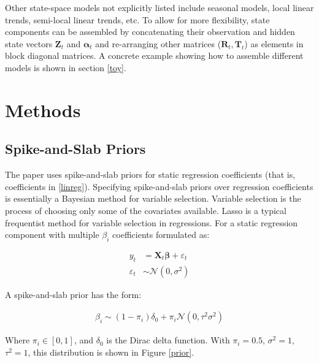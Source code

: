 \documentclass[12pt]{article}
\begin{document}
Other state-space models not explicitly  listed include seasonal models, local linear trends, semi-local linear trends, etc. To allow for more flexibility, state components can be assembled by concatenating their observation and hidden state vectors $\boldsymbol{Z}_t$ and $\boldsymbol{\alpha}_t$ and re-arranging other matrices ($\boldsymbol{R}_t, \boldsymbol{T}_t$) as elements in block diagonal matrices. A concrete example showing how to assemble different models is shown in section \ref{toy}.




\section{Methods}
\subsection{Spike-and-Slab Priors}
The paper uses spike-and-slab priors for static regression coefficients (that is, coefficients in \ref{linreg}). Specifying spike-and-slab priors over regression coefficients is essentially a Bayesian method for variable selection. Variable selection is the process of choosing only some of the covariates available. Lasso is a typical frequentist method for variable selection in regressions. For a static regression component with multiple $\beta_i$ coefficients formulated as:

\begin{align}
    y_t &=  \boldsymbol{X}_t\boldsymbol{\beta} + \varepsilon_t\\
     \varepsilon_t &\sim \mathcal{N}(0, \sigma^2)
\end{align}

A spike-and-slab prior has the form:

\begin{align} 
    \beta_i \sim (1-\pi_i)\delta_0 + \pi_i\mathcal{N}(0, \tau^2\sigma^2)
\end{align}


Where $\pi_i \in [0, 1]$, and $\delta_0$ is the Dirac delta function. With $\pi_i = 0.5$, $\sigma^2 = 1$, $\tau^2 = 1$, this distribution is shown in Figure \ref{prior}.
\end{document}
